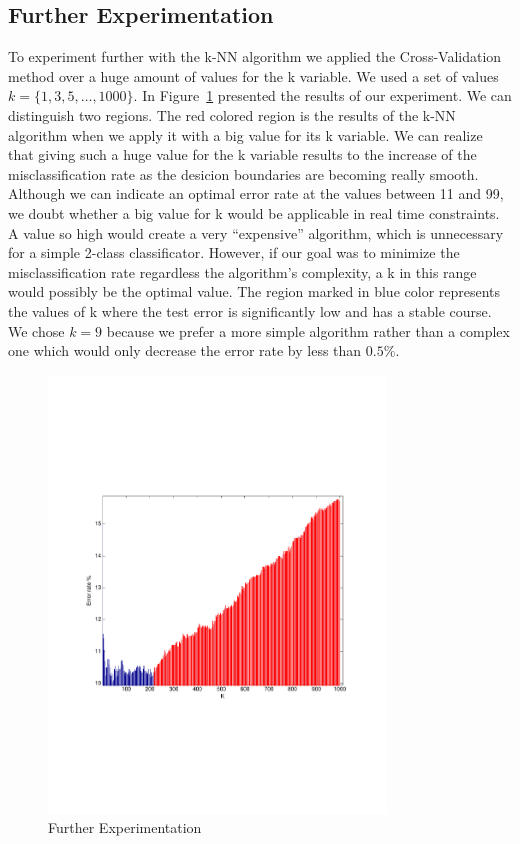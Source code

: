 \documentclass[letterpaper,11pt]{article}
\begin{document}
\subsection*{Further Experimentation}
To experiment further with the k-NN algorithm we applied the Cross-Validation method over a huge amount of values for the k variable. We used a set of values $k= \lbrace 1, 3, 5,\ldots, 1000 \rbrace$. In Figure~\ref{fig:5} presented the results of our experiment. We can distinguish two regions. The red colored region is the results of the k-NN algorithm when we apply it with a big value for its k variable. We can realize that giving such a huge value for the k variable results to the increase of the misclassification rate as the desicion boundaries are becoming really smooth. Although we can indicate an optimal error rate at the values between 11 and 99, we doubt whether a big value for k would be applicable in real time constraints. A value so high would create a very ``expensive'' algorithm, which is unnecessary for a simple 2-class classificator. However, if our goal was to minimize the misclassification rate regardless the algorithm's complexity, a k in this range would possibly be the optimal value. The region marked in blue color represents the values of k where the test error is significantly low and has a stable course. We chose $k=9$ because we prefer a more simple algorithm rather than a complex one which would only decrease the error rate by less than $0.5\%$.

\begin{figure}[!t]
\centering
  \includegraphics[trim = 0cm 7cm 0cm 7cm, clip, width=0.8\textwidth]{figures/FurtherTest.pdf}
  \caption{Further Experimentation}
  \label{fig:5}
\end{figure}
\end{document}
